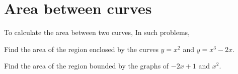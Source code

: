 \documentclass[../main.tex]{subfiles}
\begin{document}
 \section{Area between curves}
To calculate the area between two curves,  In such problems, 
\begin{figure}[H]
  
\end{figure}

%

%
%   
%

\begin{example}
  Find the area of the region enclosed by the curves \(y = x^{2}\) and \(y = x^{3} - 2x\).

\end{example}
\clearpage

\begin{exercise}
  Find the area of the region bounded by the graphs of \(-2x + 1\) and \(x^{2}\). 

\end{exercise}
\end{document}
